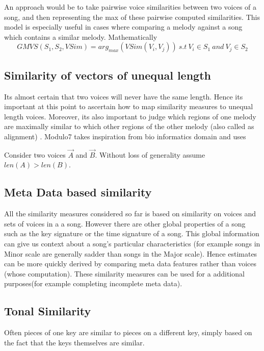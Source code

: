  An approach would be to take pairwise voice similarities between two voices of a song, and then representing the max of these pairwise computed similarities. This model is especially useful in cases where comparing a melody against a song which contains a similar melody. Mathematically 
\begin{equation}
GMVS(S_1, S_2, VSim) = arg_{max} (VSim(V_i, V_j)) \ s.t \ V_i \in S_1 \ and \ V_j \in S_2
\end{equation}

\subsection{Similarity of vectors of unequal length} \label{sim:unequal}

\noindent Its almost certain that two voices will never have the same length. Hence its important at this point to ascertain how to map similarity measures to unequal length voices. Moreover, its also important to judge which regions of one melody are maximally similar to which other regions of the other melody (also called as alignment) . Modulo7 takes inspiration from bio informatics domain and uses 

Consider two voices $\vec{A}$ and $\vec{B}$. Without loss of generality assume $len(A) > len(B)$.


\subsection{Meta Data based similarity}

\noindent All the similarity measures considered so far is based on similarity on voices and sets of voices in a a song. However there are other global properties of a song such as the key signature or the time signature of a song. This global information can give us context about a song's particular characteristics (for example songs in Minor scale are generally sadder than songs in the Major scale). Hence estimates can be more quickly derived by comparing meta data features rather than voices (whose computation). These similarity measures can be used for a additional purposes(for example completing incomplete meta data). 

\subsection{Tonal Similarity}

\noindent Often pieces of one key are similar to pieces on a different key, simply based on the fact that the keys themselves are similar. 


